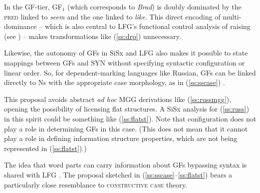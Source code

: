 \documentclass[output=paper,hidelinks]{langscibook}
\begin{document}
In the GF-tier, GF$_{1}$ (which corresponds to \textit{Brad}) is doubly dominated by the \textsc{pred} linked to \textit{seem} and the one linked to \textit{like}. This direct encoding of multi-dominance -- which is also central to LFG's functional control analysis of raising (see \citealt{bresnan1982control-complementation}) -- makes transformations like (\ref{ss:drp}) unnecessary.


Likewise, the autonomy of GFs in SiSx and LFG also makes it possible to state mappings between GFs and SYN without specifying syntactic configuration or linear order. So, for dependent-marking languages like Russian, GFs can be linked directly to Ns with the appropriate case morphology, as in (\ref{ss:sscase}) \citep[154]{culicover2009natural}.




This proposal avoids abstract \textit{ad hoc} MGG derivations like (\ref{ss:russmgg}), opening the possibility of licensing flat structures. A  SiSx analysis for (\ref{ss:russ}) in this spirit could be something like (\ref{ss:flatst}). Note that configuration does not play a role in determining GFs in this case. (This does not mean that it cannot play a role in defining information structure properties, which are not being represented in (\ref{ss:flatst}).)



The idea that word parts can carry information about GFs bypassing syntax is shared with LFG \citep{bresnan2001lexical}. The proposal sketched in (\ref{ss:sscase}--\ref{ss:flatst}) bears a particularly close resemblance to  \textsc{constructive case} theory.
\end{document}

